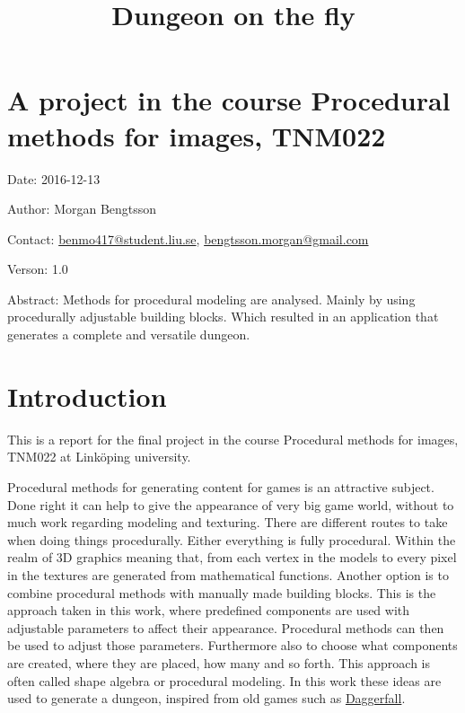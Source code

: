 \documentclass[a4paper]{article}
\title{\phantomsection%
  Dungeon on the fly%
  \label{dungeon-on-the-fly}}
\author{}
\date{}
\newenvironment{DUfieldlist}%
    {\quote\description}
    {\enddescription\endquote}
\begin{document}
\maketitle


\section{A project in the course Procedural methods for images, TNM022%
  \label{a-project-in-the-course-procedural-methods-for-images-tnm022}%
}
%
\begin{DUfieldlist}
\item[{Date:}]
2016-12-13

\item[{Author:}]
Morgan Bengtsson

\item[{Contact:}]
\href{mailto:benmo417@student.liu.se}{benmo417@student.liu.se}, \href{mailto:bengtsson.morgan@gmail.com}{bengtsson.morgan@gmail.com}

\item[{Verson:}]
1.0

\item[{Abstract:}]
Methods for procedural modeling are analysed. Mainly by using procedurally adjustable building blocks. Which resulted in an application that generates a complete and versatile dungeon.

\end{DUfieldlist}


\section{Introduction%
  \label{introduction}%
}

This is a report for the final project in the course Procedural methods for images, TNM022 at Linköping university.

Procedural methods for generating content for games is an attractive subject. Done right it can help to give the appearance of very big game world, without to much work regarding modeling and texturing. There are different routes to take when doing things procedurally. Either everything is fully procedural. Within the realm of 3D graphics meaning that, from each vertex in the models to every pixel in the textures are generated from mathematical functions. Another option is to combine procedural methods with manually made building blocks. This is the approach taken in this work, where predefined components are used with adjustable parameters to affect their appearance. Procedural methods can then be used to adjust those parameters. Furthermore also to choose what components are created, where they are placed, how many and so forth. This approach is often called shape algebra or procedural modeling. In this work these ideas are used to generate a dungeon, inspired from old games such as \hyperref[daggerfall]{Daggerfall}.
\end{document}
